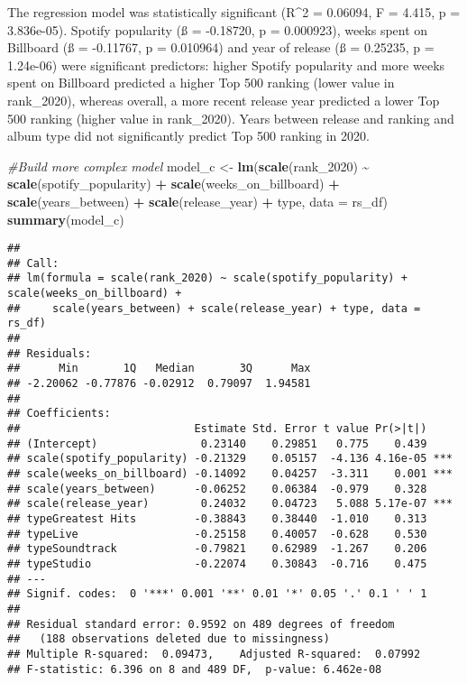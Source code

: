 \documentclass[
]{article}
\newenvironment{Shaded}{\begin{snugshade}}{\end{snugshade}}
\newcommand{\AttributeTok}[1]{\textcolor[rgb]{0.13,0.29,0.53}{#1}}
\newcommand{\CommentTok}[1]{\textcolor[rgb]{0.56,0.35,0.01}{\textit{#1}}}
\newcommand{\FunctionTok}[1]{\textcolor[rgb]{0.13,0.29,0.53}{\textbf{#1}}}
\newcommand{\NormalTok}[1]{#1}
\newcommand{\OtherTok}[1]{\textcolor[rgb]{0.56,0.35,0.01}{#1}}
\newcommand{\SpecialCharTok}[1]{\textcolor[rgb]{0.81,0.36,0.00}{\textbf{#1}}}
\begin{document}
The regression model was statistically significant (R\^{}2 = 0.06094, F
= 4.415, p = 3.836e-05). Spotify popularity (ß = -0.18720, p =
0.000923), weeks spent on Billboard (ß = -0.11767, p = 0.010964) and
year of release (ß = 0.25235, p = 1.24e-06) were significant predictors:
higher Spotify popularity and more weeks spent on Billboard predicted a
higher Top 500 ranking (lower value in rank\_2020), whereas overall, a
more recent release year predicted a lower Top 500 ranking (higher value
in rank\_2020). Years between release and ranking and album type did not
significantly predict Top 500 ranking in 2020.

\begin{Shaded}
\begin{Highlighting}[]
\CommentTok{\#Build more complex model}
\NormalTok{model\_c }\OtherTok{\textless{}{-}} \FunctionTok{lm}\NormalTok{(}\FunctionTok{scale}\NormalTok{(rank\_2020) }\SpecialCharTok{\textasciitilde{}} \FunctionTok{scale}\NormalTok{(spotify\_popularity) }\SpecialCharTok{+} \FunctionTok{scale}\NormalTok{(weeks\_on\_billboard) }\SpecialCharTok{+} \FunctionTok{scale}\NormalTok{(years\_between) }\SpecialCharTok{+} \FunctionTok{scale}\NormalTok{(release\_year) }\SpecialCharTok{+}\NormalTok{ type, }\AttributeTok{data =}\NormalTok{ rs\_df)}
\FunctionTok{summary}\NormalTok{(model\_c)}
\end{Highlighting}
\end{Shaded}

\begin{verbatim}
## 
## Call:
## lm(formula = scale(rank_2020) ~ scale(spotify_popularity) + scale(weeks_on_billboard) + 
##     scale(years_between) + scale(release_year) + type, data = rs_df)
## 
## Residuals:
##      Min       1Q   Median       3Q      Max 
## -2.20062 -0.77876 -0.02912  0.79097  1.94581 
## 
## Coefficients:
##                           Estimate Std. Error t value Pr(>|t|)    
## (Intercept)                0.23140    0.29851   0.775    0.439    
## scale(spotify_popularity) -0.21329    0.05157  -4.136 4.16e-05 ***
## scale(weeks_on_billboard) -0.14092    0.04257  -3.311    0.001 ***
## scale(years_between)      -0.06252    0.06384  -0.979    0.328    
## scale(release_year)        0.24032    0.04723   5.088 5.17e-07 ***
## typeGreatest Hits         -0.38843    0.38440  -1.010    0.313    
## typeLive                  -0.25158    0.40057  -0.628    0.530    
## typeSoundtrack            -0.79821    0.62989  -1.267    0.206    
## typeStudio                -0.22074    0.30843  -0.716    0.475    
## ---
## Signif. codes:  0 '***' 0.001 '**' 0.01 '*' 0.05 '.' 0.1 ' ' 1
## 
## Residual standard error: 0.9592 on 489 degrees of freedom
##   (188 observations deleted due to missingness)
## Multiple R-squared:  0.09473,    Adjusted R-squared:  0.07992 
## F-statistic: 6.396 on 8 and 489 DF,  p-value: 6.462e-08
\end{verbatim}
\end{document}
